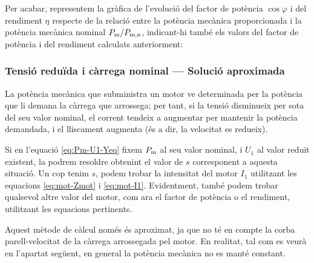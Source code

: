 \begin{exemple}
	Per acabar, representem  la gràfica de l'evolució del factor de potència $\cos\varphi$ i del rendiment $\eta$  respecte de la relació entre la potència mecànica proporcionada i la potència mecànica nominal $P_\mathrm{m}/P_\mathrm{m,n}$, indicant-hi també els valors del factor de potència i del rendiment calculats anteriorment:
	\begin{center}
		
	\end{center}

\end{exemple}
	
\subsubsection{Tensió reduïda i càrrega nominal --- Solució aproximada}

La potència mecànica que subministra un motor ve determinada per la potència que li demana la càrrega que arrossega; per tant, si la tensió disminueix per sota del seu valor nominal, el corrent tendeix a augmentar per  mantenir la potència demandada, i el lliscament augmenta (és a dir, la velocitat es redueix).

Si en l'equació \eqref{eq:Pm-U1-Yeq} fixem $P_\mathrm{m}$ al seu valor nominal, i $U_1$ al valor reduït existent, la podrem resoldre obtenint el valor de $s$ corresponent  a aquesta situació. Un cop tenim $s$, podem trobar la intensitat del motor $I_1$ utilitzant les equacions \eqref{eq:mot-Zmot} i \eqref{eq:mot-I1}. Evidentment, també podem trobar qualsevol altre valor del motor, com  ara el factor de potència o el rendiment, utilitzant les equacions pertinents.

Aquest mètode de càlcul només és aproximat, ja que no té en compte la corba parell-velocitat de la càrrega arrossegada pel motor. En realitat, tal com es veurà en l'apartat següent, en general la potència mecànica no es manté constant.

